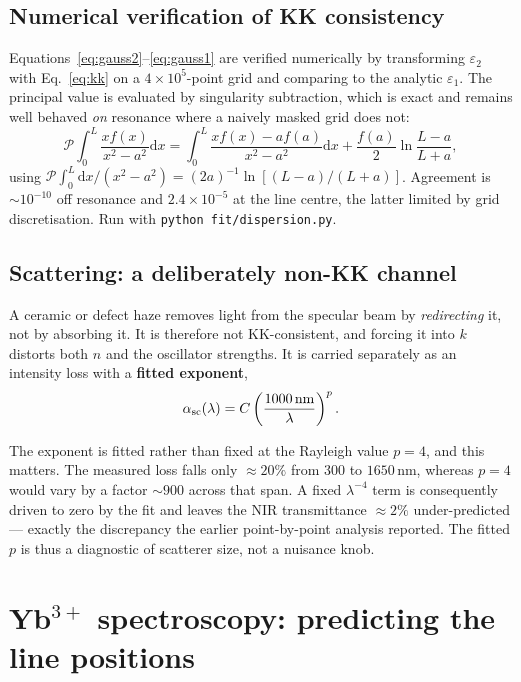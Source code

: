 \documentclass[11pt,a4paper]{article}
\newcommand{\epsm}{\varepsilon}
\newcommand{\lam}{\lambda}
\begin{document}
\subsection{Numerical verification of KK consistency}
\label{sec:kktest}

Equations~\eqref{eq:gauss2}--\eqref{eq:gauss1} are verified numerically by
transforming $\epsm_2$ with Eq.~\eqref{eq:kk} on a $4\times10^5$-point grid and
comparing to the analytic $\epsm_1$. The principal value is evaluated by
singularity subtraction, which is exact and remains well behaved \emph{on}
resonance where a naively masked grid does not:
\begin{equation}
\mathcal{P}\!\!\int_0^L\!\frac{x f(x)}{x^2-a^2}\mathrm{d}x
=\int_0^L\!\frac{x f(x)-a f(a)}{x^2-a^2}\mathrm{d}x
+\frac{f(a)}{2}\ln\frac{L-a}{L+a},
\end{equation}
using $\mathcal{P}\int_0^L \mathrm{d}x/(x^2-a^2)=(2a)^{-1}\ln[(L-a)/(L+a)]$.
Agreement is $\sim10^{-10}$ off resonance and $2.4\times10^{-5}$ at the line
centre, the latter limited by grid discretisation. Run with
\texttt{python fit/dispersion.py}.

\subsection{Scattering: a deliberately non-KK channel}
\label{sec:scatter}

A ceramic or defect haze removes light from the specular beam by
\emph{redirecting} it, not by absorbing it. It is therefore not KK-consistent,
and forcing it into $k$ distorts both $n$ and the oscillator strengths. It is
carried separately as an intensity loss with a \textbf{fitted exponent},
\begin{equation}
\alpha_{\rm sc}(\lam)=C\left(\frac{1000\,\mathrm{nm}}{\lam}\right)^{p}.
\label{eq:scat}
\end{equation}

The exponent is fitted rather than fixed at the Rayleigh value $p=4$, and this
matters. The measured loss falls only $\approx20\%$ from $300$ to $1650$\,nm,
whereas $p=4$ would vary by a factor $\sim900$ across that span. A fixed
$\lam^{-4}$ term is consequently driven to zero by the fit and leaves the NIR
transmittance $\approx2\%$ under-predicted --- exactly the discrepancy the
earlier point-by-point analysis reported. The fitted $p$ is thus a diagnostic of
scatterer size, not a nuisance knob.

\section{Yb$^{3+}$ spectroscopy: predicting the line positions}
\end{document}
